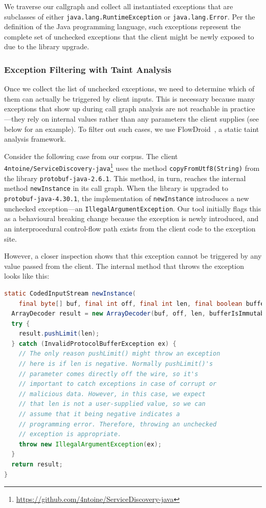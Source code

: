 We traverse our callgraph and collect all instantiated exceptions that are subclasses of either \texttt{java.lang.RuntimeException} or \texttt{java.lang.Error}. Per the definition of the Java programming language, such exceptions represent the complete set of unchecked exceptions that the client might be newly exposed to due to the library upgrade.

\subsubsection{Exception Filtering with Taint Analysis}

Once we collect the list of unchecked exceptions, we need to determine which of them can actually be triggered by client inputs. This is necessary because many exceptions that show up during call graph analysis are not reachable in practice—they rely on internal values rather than any parameters the client supplies (see below for an example). To filter out such cases, we use FlowDroid~\cite{Arzt14:_flowdroid}, a static taint analysis framework.

Consider the following case from our corpus. The client \texttt{4ntoine/ServiceDiscovery-java}\footnote{\url{https://github.com/4ntoine/ServiceDiscovery-java}} uses the method \texttt{copyFromUtf8(String)} from the library \texttt{protobuf-java-2.6.1}. This method, in turn, reaches the internal method \texttt{newInstance} in its call graph. When the library is upgraded to \texttt{protobuf-java-4.30.1}, the implementation of \texttt{newInstance} introduces a new unchecked exception—an \texttt{IllegalArgumentException}. Our tool initially flags this as a behavioural breaking change because the exception is newly introduced, and an interprocedural control-flow path exists from the client code to the exception site.

However, a closer inspection shows that this exception cannot be triggered by any value passed from the client. The internal method that throws the exception looks like this:

\begin{lstlisting}[language=Java,breaklines=true,basicstyle=\scriptsize\ttfamily]
static CodedInputStream newInstance(
    final byte[] buf, final int off, final int len, final boolean bufferIsImmutable) {
  ArrayDecoder result = new ArrayDecoder(buf, off, len, bufferIsImmutable);
  try {
    result.pushLimit(len);
  } catch (InvalidProtocolBufferException ex) {
    // The only reason pushLimit() might throw an exception
    // here is if len is negative. Normally pushLimit()'s
    // parameter comes directly off the wire, so it's 
    // important to catch exceptions in case of corrupt or
    // malicious data. However, in this case, we expect 
    // that len is not a user-supplied value, so we can 
    // assume that it being negative indicates a 
    // programming error. Therefore, throwing an unchecked 
    // exception is appropriate.
    throw new IllegalArgumentException(ex);
  }
  return result;
}
\end{lstlisting}

